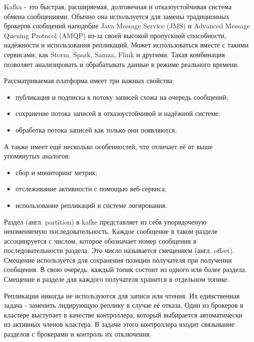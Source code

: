 Kafka - это быстрая, расширяемая, долговечная и отказоустойчивая система обмена сообщениями.
Обычно она используется для замены традиционных брокеров сообщений наподобие Java Message Service (JMS) и Advanced Message Queuing Protocol (AMQP) из-за своей высокой пропускной способности, надёжности и использования репликаций.
Может использоваться вместе с такими сервисами, как Storm, Spark, Samza, Flink и другими.
Такая комбинация позволяет анализировать и обрабатывать данные в режиме реального времени.

Рассматриваемая платформа имеет три важных свойства:
\begin{itemize}
    \item публикация и подписка к потоку записей схожа на очередь сообщений;
    \item сохранение потока записей в отказоустойчивой и надёжной системе;
    \item обработка потока записей как только они появляются.
\end{itemize}

А также имеет ещё несколько особенностей, что отличает её от выше упомянутых аналогов:
\begin{itemize}
    \item сбор и мониторинг метрик;
    \item отслеживание активности с помощью веб-сервиса;
    \item использование репликаций в системе логирования.
\end{itemize}

Раздел (англ. partition) в kafke представляет из себя упорядоченую неизменяемую последовательность.
Каждое сообщение в таком разделе ассоциируется с числом, которое обозначает номер сообщения в последовательности раздела.
Это число называется смещением (англ. offset).
Смещение используется для сохранения позиции получателя при получении сообщения.
В свою очередь, каждый топик состоит из одного или более раздела.
Смещение в разделе для каждого получателя хранится в отдельном топике.

Репликации никогда не используются для записи или чтения.
Их единственная задача - заменить лидирующую реплику в случае её отказа.
Один из брокеров в кластере выступает в качестве контроллера, который выбирается автоматически из активных членов кластера.
В задачи этого контроллера входит связывание разделов с брокерами и контроль их отключения.

